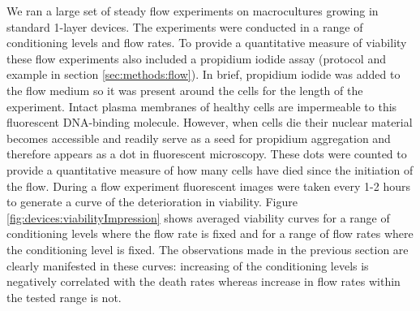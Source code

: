     We ran a large set of steady flow experiments on macrocultures growing in standard 1-layer devices. The experiments were conducted in a range of conditioning levels and flow rates. To provide a quantitative measure of viability these flow experiments also included a propidium iodide assay (protocol and example in section \ref{sec:methods:flow}). In brief, propidium iodide was added to the flow medium so it was present around the cells for the length of the experiment. Intact plasma membranes of healthy cells are impermeable to this fluorescent DNA-binding molecule. However, when cells die their nuclear material becomes accessible and readily serve as a seed for propidium aggregation and therefore appears as a dot in fluorescent microscopy. These dots were counted to provide a quantitative measure of how many cells have died since the initiation of the flow. During a flow experiment fluorescent images were taken every 1-2 hours to generate a curve of the deterioration in viability. Figure \ref{fig:devices:viabilityImpression} shows averaged viability curves for a range of conditioning levels where the flow rate is fixed and for a range of flow rates where the conditioning level is fixed. The observations made in the previous section are clearly manifested in these curves: increasing of the conditioning levels is negatively correlated with the death rates whereas increase in flow rates within the tested range is not.

